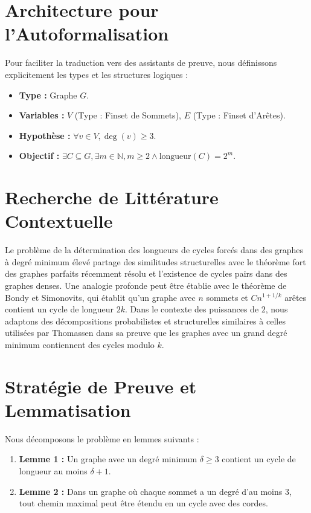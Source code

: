 \documentclass[11pt,a4paper]{article}
\begin{document}
\section{Architecture pour l'Autoformalisation}

Pour faciliter la traduction vers des assistants de preuve, nous d\'efinissons explicitement les types et les structures logiques :
\begin{itemize}
    \item \textbf{Type :} Graphe $G$.
    \item \textbf{Variables :} $V$ (Type : Finset de Sommets), $E$ (Type : Finset d'Ar\^etes).
    \item \textbf{Hypoth\`ese :} $\forall v \in V, \deg(v) \ge 3$.
    \item \textbf{Objectif :} $\exists C \subseteq G, \exists m \in \mathbb{N}, m \ge 2 \land \text{longueur}(C) = 2^m$.
\end{itemize}

\section{Recherche de Litt\'erature Contextuelle}

Le probl\`eme de la d\'etermination des longueurs de cycles forc\'es dans des graphes \`a degr\'e minimum \'elev\'e partage des similitudes structurelles avec le th\'eor\`eme fort des graphes parfaits r\'ecemment r\'esolu et l'existence de cycles pairs dans des graphes denses. Une analogie profonde peut \^etre \'etablie avec le th\'eor\`eme de Bondy et Simonovits, qui \'etablit qu'un graphe avec $n$ sommets et $C n^{1 + 1/k}$ ar\^etes contient un cycle de longueur $2k$. Dans le contexte des puissances de $2$, nous adaptons des d\'ecompositions probabilistes et structurelles similaires \`a celles utilis\'ees par Thomassen dans sa preuve que les graphes avec un grand degr\'e minimum contiennent des cycles modulo $k$.

\section{Strat\'egie de Preuve et Lemmatisation}

Nous d\'ecomposons le probl\`eme en lemmes suivants :
\begin{enumerate}
    \item \textbf{Lemme 1 :} Un graphe avec un degr\'e minimum $\delta \ge 3$ contient un cycle de longueur au moins $\delta + 1$.
    \item \textbf{Lemme 2 :} Dans un graphe o\`u chaque sommet a un degr\'e d'au moins 3, tout chemin maximal peut \^etre \'etendu en un cycle avec des cordes.
\end{enumerate}
\end{document}
